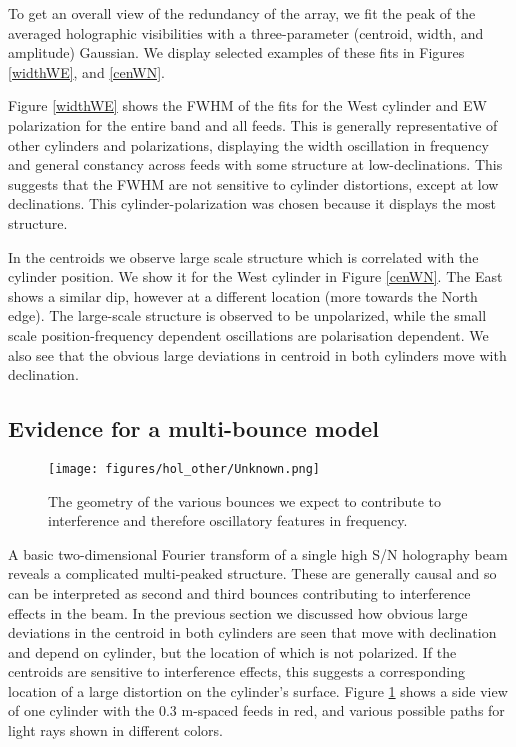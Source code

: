 To get an overall view of the redundancy of the array, we fit the peak of the averaged holographic visibilities with a three-parameter (centroid, width, and amplitude) Gaussian. We display selected examples of these fits in Figures \ref{widthWE}, and \ref{cenWN}. 

Figure \ref{widthWE} shows the FWHM of the fits for the West cylinder and EW polarization for the entire band and all feeds. This is generally representative of other cylinders and polarizations, displaying the width oscillation in frequency and general constancy across feeds with some structure at low-declinations. This suggests that the FWHM are not sensitive to cylinder distortions, except at low declinations. This cylinder-polarization was chosen because it displays the most structure.

In the centroids we observe large scale structure which is correlated with the cylinder position. We show it for the West cylinder in Figure \ref{cenWN}. The East shows a similar dip, however at a different location (more towards the North edge). The large-scale structure is observed to be unpolarized, while the small scale position-frequency dependent oscillations are polarisation dependent. We also see that the obvious large deviations in centroid in both cylinders move with declination.

\subsection{Evidence for a multi-bounce model}

\begin{figure}[h!]
\begin{center}
\texttt{[image: figures/hol\_other/Unknown.png]}
\end{center}
\caption{The geometry of the various bounces we expect to contribute to interference and therefore oscillatory features in frequency.}
\label{unknown}
\end{figure}

A basic two-dimensional Fourier transform of a single high S/N holography beam reveals a complicated multi-peaked structure. These are generally causal and so can be interpreted as second and third bounces contributing to interference effects in the beam. In the previous section we discussed how obvious large deviations in the centroid in both cylinders are seen that move with declination and depend on cylinder, but the location of which is not polarized. If the centroids are sensitive to interference effects, this suggests a corresponding location of a large distortion on the cylinder's surface. Figure \ref{unknown} shows a side view of one cylinder with the 0.3 m-spaced feeds in red, and various possible paths for light rays shown in different colors. 

